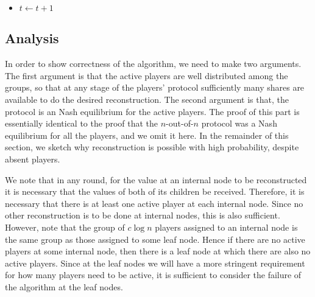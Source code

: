 \documentclass[12pt]{article}
\theoremstyle{definition}
\begin{document}
\begin{algorithm}
{\begin{itemize}
\begin{enumerate}
\begin{enumerate}
\item (as a non-root internal node) Receive copies of $s_t$ and $m_{t+1}$ 
and tags from all active members of the group at 
your parent node and check them. If fault detected, 
output $S$ and quit.
\item Set $S=s_t$ and $M=m_{t+1}$.
\item Send $s_t$ and $m_{t+1}$ to all active members of the groups at your 
children nodes.
If you are a short player and have no authentication tags, output $s_t$ and 
quit.
\end{enumerate}
\end{enumerate}
\item[] $t \leftarrow t+1$
\end{itemize}
}
\end{algorithm}






\subsection{Analysis}

In order to show correctness of the algorithm, we need to make two
arguments. The first argument is that the active players are well
distributed among the groups, so that at any 
stage of the players' protocol
sufficiently many shares are available to do the desired
reconstruction. The second argument is that, the protocol is an
Nash equilibrium for the active players. The proof of this
part is essentially identical to the proof that the $n$-out-of-$n$
protocol was a Nash equilibrium for all the players, and
we omit it here. In the remainder of this section, we sketch why
reconstruction is possible with high probability, despite absent
players.

We note that in any round, for the value at an internal node to be 
reconstructed it is necessary that the values of both of its children be
received. Therefore, it is necessary that there is at least one active
player at each internal node.  Since no other reconstruction is to be
done at internal nodes, this is also sufficient. However, note that
the group of $c\log n$ players assigned to an internal node is the
same group as those assigned to some leaf node. Hence if there are no
active players at some internal node, then there is a leaf node at
which there are also no active players. Since at the leaf nodes we
will have a more stringent requirement for how many players need to be
active, it is sufficient to consider the failure of the algorithm at
the leaf nodes.
\end{document}
